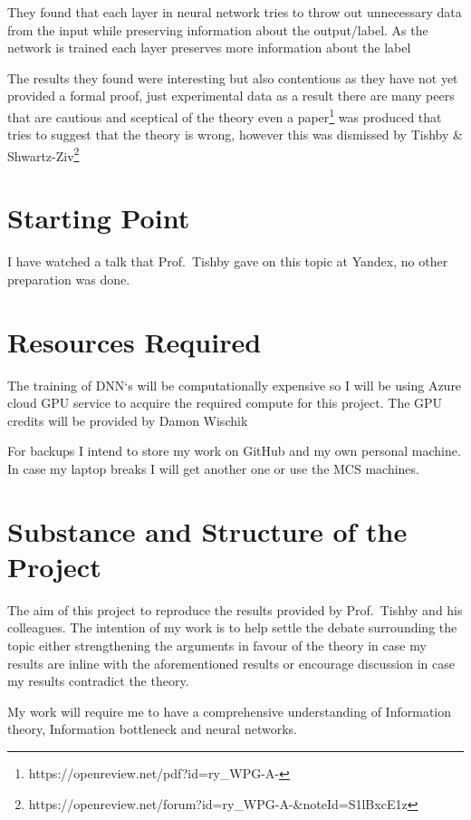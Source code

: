 \documentclass[12pt]{article}
\begin{document}
They found that each layer in neural network tries to throw out unnecessary data
from the input while preserving information about the output/label. As the
network is trained each layer preserves more information about the label

The results they found were interesting but also contentious as they have not
yet provided a formal proof, just experimental data as a result there are many
peers that are cautious and sceptical of the theory even a
paper\footnote{https://openreview.net/pdf?id=ry\_WPG-A-} was produced that tries
to suggest that the theory is wrong, however this was dismissed by Tishby \&
Shwartz-Ziv\footnote{https://openreview.net/forum?id=ry\_WPG-A-\&noteId=S1lBxcE1z}


\section*{Starting Point}

I have watched a talk that Prof.\ Tishby gave on this topic at Yandex, no other
preparation was done. 

\section*{Resources Required}

The training of DNN`s will be computationally expensive so I will be using Azure
cloud GPU service to acquire the required compute for this project. The GPU
credits will be provided by Damon Wischik

For backups I intend to store my work on GitHub and my own personal machine. In
case my laptop breaks I will get another one or use the MCS machines.

\section*{Substance and Structure of the Project}

The aim of this project to reproduce the results provided by Prof.\ Tishby and
his colleagues. The intention of my work is to help settle the debate surrounding the
topic either strengthening the arguments in favour of the theory in case my
results are inline with the aforementioned results or encourage discussion in
case my results contradict the theory.

My work will require me to have a comprehensive understanding of Information
theory, Information bottleneck and neural networks.
\end{document}
